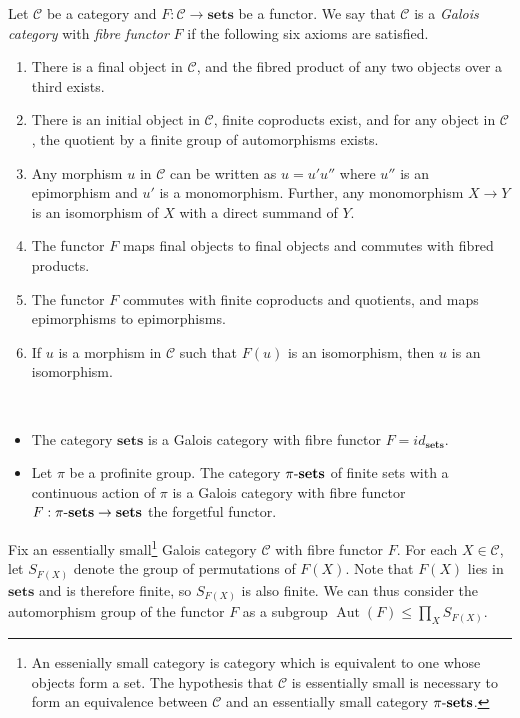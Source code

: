 \documentclass[11pt,openany]{book} %
\newcommand{\Aut}{\operatorname{Aut}}
\newcommand{\xsets}[1]{#1\textnormal{-}\mathbf{sets}}
\begin{document}
\begin{definition}
Let $\mathcal{C}$ be a category and $F : \mathcal{C} \to \mathbf{sets}$ be a functor. We say that $\mathcal{C}$ is a \emph{Galois category} with \emph{fibre functor} $F$ if the following six axioms are satisfied.
\begin{enumerate}
	\item There is a final object in $\mathcal{C}$, and the fibred product of any two objects over a third exists.
    \item There is an initial object in $\mathcal{C}$, finite coproducts exist, and for any object in $\mathcal{C}$, the quotient by a finite group of automorphisms exists.
    \item Any morphism $u$ in $\mathcal{C}$ can be written as $u = u'u''$ where $u''$ is an epimorphism and $u'$ is a monomorphism. Further, any monomorphism $X \to Y$ is an isomorphism of $X$ with a direct summand of $Y$.
    \item The functor $F$ maps final objects to final objects and commutes with fibred products.
    \item The functor $F$ commutes with finite coproducts and quotients, and maps epimorphisms to epimorphisms.
    \item If $u$ is a morphism in $\mathcal{C}$ such that $F(u)$ is an isomorphism, then $u$ is an isomorphism.
\end{enumerate}
\end{definition}

\begin{example}\
\begin{itemize}
	\item The category $\mathbf{sets}$ is a Galois category with fibre functor $F = id_{\mathbf{sets}}$.
	\item Let $\pi$ be a profinite group. The category $\xsets{\pi}$ of finite sets with a continuous action of $\pi$ is a Galois category with fibre functor $F : \xsets{\pi} \to \mathbf{sets}$ the forgetful functor.
\end{itemize}
\end{example}

Fix an essentially small\footnote{An essenially small category is category which is equivalent to one whose objects form a set. The hypothesis that $\mathcal{C}$ is essentially small is necessary to form an equivalence between $\mathcal{C}$ and an essentially small category $\xsets{\pi}$.} Galois category $\mathcal{C}$ with fibre functor $F$. For each $X \in \mathcal{C}$, let $S_{F(X)}$ denote the group of permutations of $F(X)$. Note that $F(X)$ lies in $\mathbf{sets}$ and is therefore finite, so $S_{F(X)}$ is also finite. We can thus consider the automorphism group of the functor $F$ as a subgroup $\Aut(F) \leq \prod_X S_{F(X)}$.\\
\end{document}
